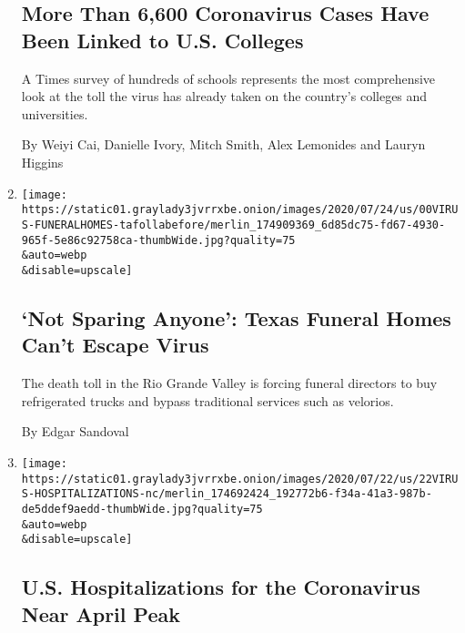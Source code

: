 \begin{enumerate}
  \hypertarget{more-than-6600-coronavirus-cases-have-been-linked-to-us-colleges}{%
  \subsection{More Than 6,600 Coronavirus Cases Have Been Linked to U.S.
  Colleges}\label{more-than-6600-coronavirus-cases-have-been-linked-to-us-colleges}}

  A Times survey of hundreds of schools represents the most
  comprehensive look at the toll the virus has already taken on the
  country's colleges and universities.

  By Weiyi Cai, Danielle Ivory, Mitch Smith, Alex Lemonides and Lauryn
  Higgins
\item
  \href{/2020/07/28/us/coronavirus-texas-funeral-homes.html}{}

  \texttt{[image: https://static01.graylady3jvrrxbe.onion/images/2020/07/24/us/00VIRUS-FUNERALHOMES-tafollabefore/merlin\_174909369\_6d85dc75-fd67-4930-965f-5e86c92758ca-thumbWide.jpg?quality=75\\\&auto=webp\\\&disable=upscale]}

  \hypertarget{not-sparing-anyone-texas-funeral-homes-cant-escape-virus}{%
  \subsection{`Not Sparing Anyone': Texas Funeral Homes Can't Escape
  Virus}\label{not-sparing-anyone-texas-funeral-homes-cant-escape-virus}}

  The death toll in the Rio Grande Valley is forcing funeral directors
  to buy refrigerated trucks and bypass traditional services such as
  velorios.

  By Edgar Sandoval
\item
  \href{/2020/07/22/us/coronavirus-hospitalizations-near-peak.html}{}

  \texttt{[image: https://static01.graylady3jvrrxbe.onion/images/2020/07/22/us/22VIRUS-HOSPITALIZATIONS-nc/merlin\_174692424\_192772b6-f34a-41a3-987b-de5ddef9aedd-thumbWide.jpg?quality=75\\\&auto=webp\\\&disable=upscale]}

  \hypertarget{us-hospitalizations-for-the-coronavirus-near-april-peak}{%
  \subsection{U.S. Hospitalizations for the Coronavirus Near April
  Peak}\label{us-hospitalizations-for-the-coronavirus-near-april-peak}}


\end{enumerate}
